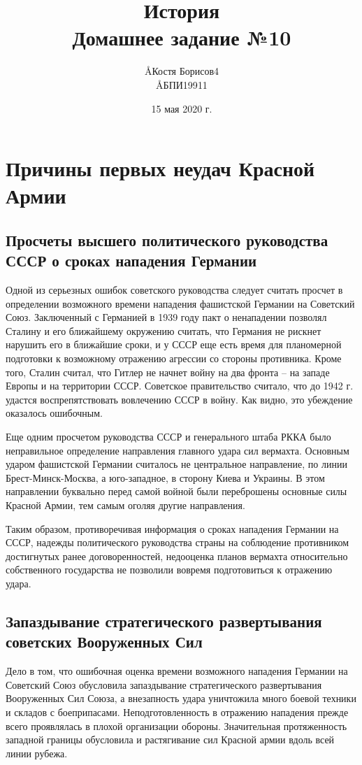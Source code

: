 \documentclass[12pt]{article}
\title{История \\ Домашнее задание №10}
\author{\AA{Костя Борисов}{4} \\ \AA{БПИ199}{11}}
\date{15 мая 2020 г.}
\begin{document}
  \maketitle

  \setcounter{section}{1}
  \section{Причины первых неудач Красной Армии}
  \subsection{Просчеты высшего политического руководства СССР о сроках нападения Германии}
  Одной из серьезных ошибок советского руководства следует считать просчет
  в определении возможного времени нападения фашистской Германии на Советский Союз.
  Заключенный с Германией в 1939 году пакт о ненападении позволял Сталину и его ближайшему окружению считать,
  что Германия не рискнет нарушить его в ближайшие сроки,
  и у СССР еще есть время для планомерной подготовки к возможному отражению агрессии со стороны противника.
  Кроме того, Сталин считал, что Гитлер не начнет войну на два фронта -- на западе Европы и на территории СССР.
  Советское правительство считало, что до 1942 г. удастся воспрепятствовать вовлечению СССР в войну.
  Как видно, это убеждение оказалось ошибочным.

  Еще одним просчетом руководства СССР и генерального штаба РККА было неправильное определение направления главного удара сил вермахта.
  Основным ударом фашистской Германии считалось не центральное направление, по линии Брест-Минск-Москва,
  а юго-западное, в сторону Киева и Украины.
  В этом направлении буквально перед самой войной были переброшены основные силы Красной Армии, тем самым оголяя другие направления.

  Таким образом, противоречивая информация о сроках нападения Германии на СССР, надежды политического руководства страны на соблюдение противником достигнутых ранее договоренностей, недооценка планов вермахта относительно собственного государства не позволили вовремя подготовиться к отражению удара.

  \subsection{Запаздывание стратегического развертывания советских Вооруженных Сил}
  Дело в том, что ошибочная оценка времени возможного нападения Германии на Советский Союз обусловила запаздывание стратегического развертывания Вооруженных Сил Союза, а внезапность удара уничтожила много боевой техники и складов с боеприпасами.
  Неподготовленность в отражению нападения прежде всего проявлялась в плохой организации обороны.
  Значительная протяженность западной границы обусловила и растягивание сил Красной армии вдоль всей линии рубежа.
\end{document}
